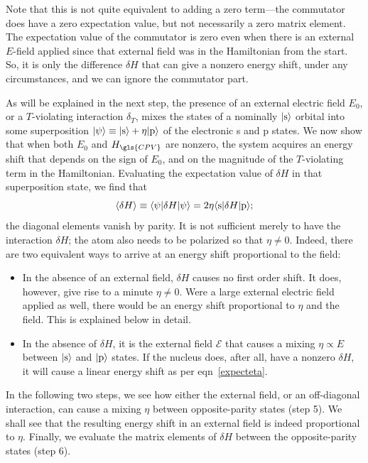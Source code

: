 Note that this is not quite equivalent to adding a zero term---the commutator
does have a zero expectation value, but not necessarily a zero matrix element.
The expectation value of the commutator is zero even when there is an external
$E$-field applied since that external field was in the Hamiltonian from the
start. So, it is only the difference $\delta H$ that can give a nonzero energy
shift, under any circumstances, and we can ignore the commutator part.

As will be explained in the next step, the presence of an external electric
field $E_0$, or a $T$-violating interaction $\delta_T$, mixes the states of a
nominally $|\text{s}\rangle$ orbital into
some superposition $|\psi\rangle\equiv|\text{s}\rangle+\eta|\text{p}\rangle$ of the
electronic s and p states. We now show that when both $E_0$ and $H_{\gls{CPV}}$
are nonzero, the system acquires an energy shift that depends on the sign of
$E_0$, and on the magnitude of the $T$-violating term in the Hamiltonian.
Evaluating the expectation value of $\delta H$ in that superposition state, we
find that
%
\begin{equation}
    \label{expecteta}
\langle \delta H\rangle\equiv
\langle\psi|\delta H|\psi\rangle
=
2\eta\langle\text{s}|\delta H|\text{p}\rangle;
\end{equation}
%
the diagonal elements vanish by parity. It is not sufficient merely to have the
interaction $\delta H$; the atom also needs to be polarized so that $\eta\ne0$.
Indeed, there are two equivalent ways to arrive at an energy shift proportional
to the field:
%
\begin{itemize}
    \item In the absence of an external field, $\delta H$ causes no first order
       shift. It does, however, give rise to a minute $\eta\ne0$. Were a large
       external electric field applied as well, there would be an energy shift
       proportional to $\eta$ and the field. This is explained below in detail.
    \item In the absence of $\delta H$, it is the external field $\mathcal E$
       that causes a mixing $\eta\propto E$ between $|\text s\rangle$ and
       $|\text p\rangle$ states. If the nucleus does, after all, have a nonzero
       $\delta H$, it will cause a linear energy shift as per
       eqn~\ref{expecteta}.
\end{itemize}

In the following two steps, we see how either the external field, or an
off-diagonal interaction, can cause a mixing $\eta$ between opposite-parity
states (step 5). We shall see that the resulting energy shift in an external
field is indeed proportional to $\eta$. Finally, we evaluate the matrix elements
of $\delta H$ between the opposite-parity states (step 6).


